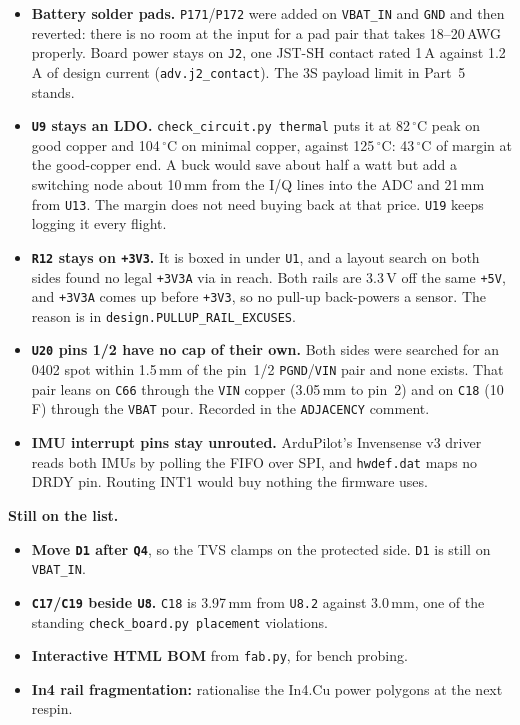 \documentclass[11pt,a4paper]{article}
\newcommand{\file}[1]{\texttt{\small #1}}
\newcommand{\degC}{$^\circ$C}
\begin{document}
\begin{itemize}
\item \textbf{Battery solder pads.} \file{P171}/\file{P172} were added on \file{VBAT\_IN} and
\file{GND} and then reverted: there is no room at the input for a pad pair that takes
18--20\,AWG properly. Board power stays on \file{J2}, one JST-SH contact rated 1\,A against
1.2\,A of design current (\file{adv.j2\_contact}). The 3S payload limit in Part~5 stands.
\item \textbf{\file{U9} stays an LDO.} \file{check\_circuit.py thermal} puts it at 82\,\degC{}
peak on good copper and 104\,\degC{} on minimal copper, against 125\,\degC{}: 43\,\degC{} of
margin at the good-copper end. A buck would save about half a watt but add a switching node
about 10\,mm from the I/Q lines into the ADC and 21\,mm from \file{U13}. The margin does not
need buying back at that price. \file{U19} keeps logging it every flight.
\item \textbf{\file{R12} stays on \file{+3V3}.} It is boxed in under \file{U1}, and a layout
search on both sides found no legal \file{+3V3A} via in reach. Both rails are 3.3\,V off the
same \file{+5V}, and \file{+3V3A} comes up before \file{+3V3}, so no pull-up back-powers a
sensor. The reason is in \file{design.PULLUP\_RAIL\_EXCUSES}.
\item \textbf{\file{U20} pins 1/2 have no cap of their own.} Both sides were searched for an
0402 spot within 1.5\,mm of the pin~1/2 \file{PGND}/\file{VIN} pair and none exists. That pair
leans on \file{C66} through the \file{VIN} copper (3.05\,mm to pin~2) and on \file{C18}
(10\,\textmu F) through the \file{VBAT} pour. Recorded in the \file{ADJACENCY} comment.
\item \textbf{IMU interrupt pins stay unrouted.} ArduPilot's Invensense v3 driver reads both
IMUs by polling the FIFO over SPI, and \file{hwdef.dat} maps no DRDY pin. Routing INT1 would
buy nothing the firmware uses.
\end{itemize}

\textbf{Still on the list.}

\begin{itemize}
\item \textbf{Move \file{D1} after \file{Q4}}, so the TVS clamps on the protected side.
\file{D1} is still on \file{VBAT\_IN}.
\item \textbf{\file{C17}/\file{C19} beside \file{U8}.} \file{C18} is 3.97\,mm from
\file{U8.2} against 3.0\,mm, one of the standing \file{check\_board.py placement} violations.
\item \textbf{Interactive HTML BOM} from \file{fab.py}, for bench probing.
\item \textbf{In4 rail fragmentation:} rationalise the In4.Cu power polygons at the next respin.
\end{itemize}
\end{document}
